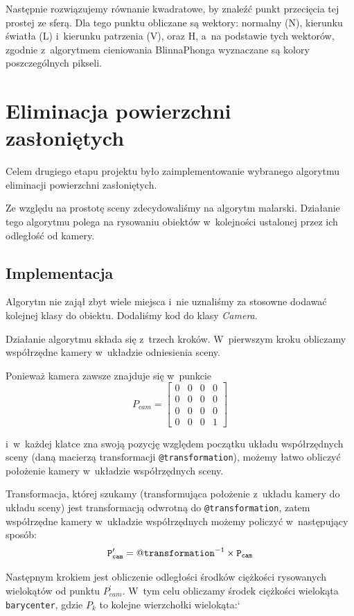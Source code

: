 \documentclass[a4paper]{article}
\begin{document}
{Następnie rozwiązujemy równanie kwadratowe, by znaleźć punkt przecięcia tej prostej ze sferą.
Dla tego punktu obliczane są wektory: normalny (N), kierunku światła (L) i~kierunku patrzenia (V), oraz H, a~na podstawie tych wektorów, zgodnie z~algorytmem cieniowania Blinna\dywiz Phonga wyznaczane są kolory poszczególnych pikseli.

\section{Eliminacja powierzchni zasłoniętych}
Celem drugiego etapu projektu było zaimplementowanie wybranego algorytmu eliminacji powierzchni zasłoniętych.

Ze względu na prostotę sceny zdecydowaliśmy na algorytm malarski.
Działanie tego algorytmu polega na rysowaniu obiektów w~kolejności ustalonej przez ich odległość od kamery.

\subsection{Implementacja}
Algorytm nie zajął zbyt wiele miejsca i~nie uznaliśmy za stosowne dodawać kolejnej klasy do obiektu.
Dodaliśmy kod do klasy \emph{Camera}.

Działanie algorytmu składa się z~trzech kroków.
W~pierwszym kroku obliczamy współrzędne kamery w~układzie odniesienia sceny.

Ponieważ kamera zawsze znajduje się w~punkcie
\[
P_{cam} = 
\begin{bmatrix}
  0 & 0 & 0 & 0 \\
  0 & 0 & 0 & 0 \\
  0 & 0 & 0 & 0 \\
  0 & 0 & 0 & 1
\end{bmatrix}
\]

i~w~każdej klatce zna swoją pozycję względem początku układu współrzędnych sceny (daną macierzą transformacji \texttt{@transformation}), możemy łatwo obliczyć położenie kamery w~układzie współrzędnych sceny.

Transformacja, której szukamy (transformująca położenie z~układu kamery do układu sceny) jest transformacją odwrotną do \texttt{@transformation}, zatem współrzędne kamery w~układzie współrzędnych możemy policzyć w~następujący sposób:
$$
\tt{} P_{cam}^\prime = \tt{@transformation}\tt^{-1} \times P_{cam}
$$

Następnym krokiem jest obliczenie odległości środków ciężkości rysowanych wielokątów od punktu $P_{cam}^\prime$. 
W~tym celu obliczamy środek ciężkości wielokąta \texttt{barycenter}, gdzie $P_k$ to kolejne wierzchołki wielokąta:`

}
\end{document}
